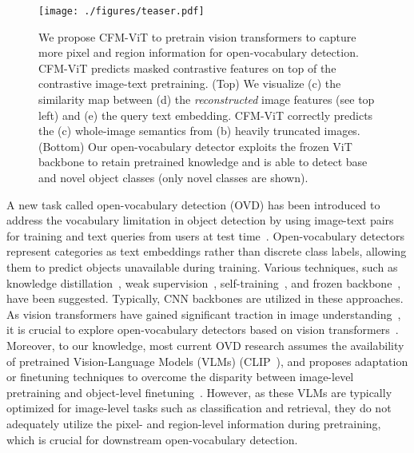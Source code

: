 \documentclass[10pt,twocolumn,letterpaper]{article}
\newcommand{\ours}{CFM-ViT\xspace}
\begin{document}
\begin{figure}
\texttt{[image: ./figures/teaser.pdf]}
\caption{We propose \ours to pretrain vision transformers to capture more pixel and region information for open-vocabulary detection. \ours predicts masked contrastive features on top of the contrastive image-text pretraining. (Top) We visualize (c) the similarity map between (d) the \textit{reconstructed} image features (see top left) and (e) the query text embedding. \ours correctly predicts the (c) whole-image semantics from (b) heavily truncated images. (Bottom) Our open-vocabulary detector exploits the frozen ViT backbone to retain pretrained knowledge and is able to detect base and novel object classes (only novel classes are shown).}
\label{fig:teaser}
\vspace{-5mm}
\end{figure}

A new task called open-vocabulary detection (OVD) has been introduced to address the vocabulary limitation in object detection by using image-text pairs for training and text queries from users at test time~\cite{Zareian_2021_CVPR}. Open-vocabulary detectors represent categories as text embeddings rather than discrete class labels, allowing them to predict objects unavailable during training. Various techniques, such as knowledge distillation~\cite{gu2022openvocabulary,du2022learning}, weak supervision~\cite{zhou2022detecting}, self-training~\cite{zhong2021regionclip,rasheed2022bridging,zhao2022exploiting}, and frozen backbone~\cite{kuo2022f}, have been suggested. Typically, CNN backbones are utilized in these approaches. As vision transformers have gained significant traction in image understanding~\cite{dosovitskiy2020image,zhang2022segvit,He_2022_CVPR,bao2021beit}, it is crucial to explore open-vocabulary detectors based on vision transformers~\cite{minderer2022simple}. Moreover, to our knowledge, most current OVD research assumes the availability of pretrained Vision-Language Models (VLMs) (\eg CLIP~\cite{radford2021clip}), and proposes adaptation or finetuning techniques to overcome the disparity between image-level pretraining and object-level finetuning~\cite{gu2022openvocabulary,du2022learning,zhong2021regionclip,zhao2022exploiting,rasheed2022bridging}. However, as these VLMs are typically optimized for image-level tasks such as classification and retrieval, they do not adequately utilize the pixel- and region-level information during pretraining, which is crucial for downstream open-vocabulary detection.
\end{document}
